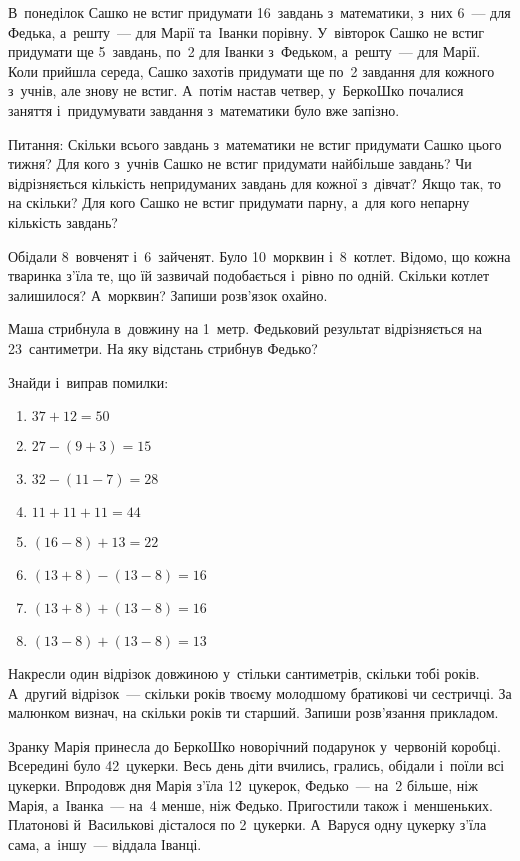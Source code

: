 \problem
В~понеділок Сашко не встиг придумати 16~завдань з~математики,
з~них 6~--- для Федька, а~решту~--- для Марії та~Іванки порівну.
У~вівторок Сашко не встиг придумати ще 5~завдань,
по~2 для Іванки з~Федьком, а~решту~--- для Марії.
Коли прийшла середа, Сашко захотів придумати
ще по~2 завдання для кожного з~учнів, але знову не встиг.
А~потім настав четвер, у~БеркоШко почалися заняття
і~придумувати завдання з~математики було вже запізно.

Питання:
Скільки всього завдань з~математики не встиг придумати Сашко цього тижня?
Для кого з~учнів Сашко не встиг придумати найбільше завдань?
Чи відрізняється кількість непридуманих завдань для кожної з~дівчат?
Якщо так, то на скільки?
Для кого Сашко не встиг придумати парну, а~для кого непарну кількість завдань?


\problem
Обідали 8~вовченят і~6~зайченят. Було 10~морквин і~8~котлет.
Відомо, що кожна тваринка з'їла те, що їй зазвичай подобається
і~рівно по одній.
Скільки котлет залишилося? А~морквин? Запиши розв'язок охайно.


\problem
Маша стрибнула в~довжину на 1~метр.
Федьковий результат відрізняється на 23~сантиметри.
На яку відстань стрибнув Федько?


\problem
Знайди і~виправ помилки:
\begin{multicols}{2}
    \begin{enumerate}
        \item $37 + 12 = 50$
        \item $27 - (9 + 3) = 15$
        \item $32 - (11 - 7) = 28$
        \item $11 + 11 + 11 = 44$
        \item $(16 - 8) + 13 = 22$
        \item $(13 + 8) - (13 - 8) = 16$
        \item $(13 + 8) + (13 - 8) = 16$
        \item $(13 - 8) + (13 - 8) = 13$
    \end{enumerate}
\end{multicols}


\problem
Накресли один відрізок довжиною у~стільки сантиметрів, скільки тобі років.
А~другий відрізок~--- скільки років твоєму молодшому братикові чи сестричці.
За малюнком визнач, на скільки років ти старший.
Запиши розв’язання прикладом.


\problem
Зранку Марія принесла до БеркоШко новорічний подарунок у~червоній коробці.
Всередині було 42~цукерки.
Весь день діти вчились, грались, обідали і~поїли всі цукерки.
Впродовж дня Марія з’їла 12~цукерок, Федько~--- на~2 більше, ніж Марія,
а~Іванка~--- на~4 менше, ніж Федько.
Пригостили також і~меншеньких. Платонові й~Василькові дісталося по 2~цукерки.
А~Варуся одну цукерку з’їла сама, а~іншу~--- віддала Іванці.

